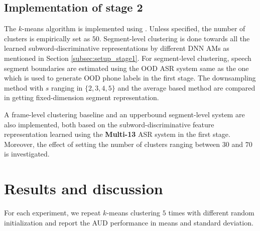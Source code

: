 \documentclass[a4paper]{article}
\begin{document}

\subsection{Implementation of stage 2}
\label{subsec:setup_stage2}

The $k$-means algorithm is implemented using \cite{scikit-learn}. 
Unless specified, the number of clusters is empirically set as $50$.
Segment-level clustering is done towards all the learned subword-discriminative representations by different DNN AMs as mentioned in Section \ref{subsec:setup_stage1}. 
For segment-level clustering, speech segment boundaries are estimated using the OOD ASR system same as the one which is used to generate OOD phone labels in the first stage. 
The downsampling method with $s$ ranging in $\{2,3,4,5\}$ and the average based method are compared in getting fixed-dimension segment  representation. 

A frame-level clustering baseline and an upperbound segment-level system are also implemented, both based on the subword-discriminative feature representation  learned using the \textbf{Multi-13} ASR system in the first stage. Moreover, the effect of setting  the number of clusters ranging between $30$ and $70$ is investigated.




 

\section{Results and discussion}
\label{sec:results}
For each experiment, we repeat $k$-means clustering $5$ times with different  random initialization and report the AUD performance in means and standard deviation.
\end{document}
